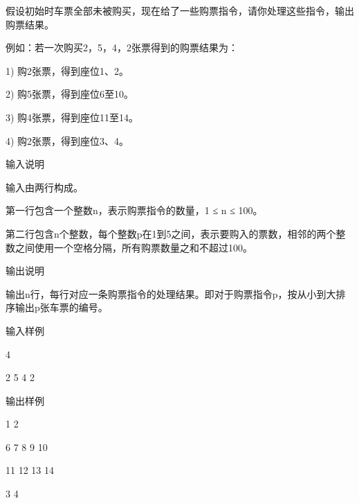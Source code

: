 假设初始时车票全部未被购买，现在给了一些购票指令，请你处理这些指令，输出购票结果。 

例如：若一次购买2，5，4，2张票得到的购票结果为： 

1) 购2张票，得到座位1、2。 

2) 购5张票，得到座位6至10。 

3) 购4张票，得到座位11至14。 

4) 购2张票，得到座位3、4。 

输入说明

输入由两行构成。 

第一行包含一个整数n，表示购票指令的数量，1 ≤ n ≤ 100。 

第二行包含n个整数，每个整数p在1到5之间，表示要购入的票数，相邻的两个整数之间使用一个空格分隔，所有购票数量之和不超过100。 

输出说明

输出n行，每行对应一条购票指令的处理结果。即对于购票指令p，按从小到大排序输出p张车票的编号。 

输入样例

4 

2 5 4 2 

输出样例

1 2 

6 7 8 9 10 

11 12 13 14 

3 4 

